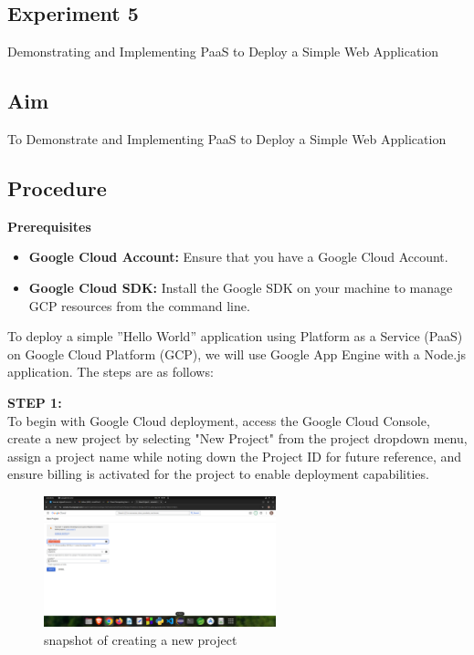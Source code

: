 \documentclass[12pt]{article}
\begin{document}
\begin{spacing}{1.5}
\begin{adjustwidth}{0cm}{0cm}
\begin{justify}
\newpage

\section{Experiment 5}
Demonstrating and Implementing PaaS to Deploy a Simple Web Application

\subsection{Aim}
To Demonstrate and Implementing PaaS to Deploy a Simple Web Application

\subsection{Procedure}

\textbf{Prerequisites}

\begin{itemize}
    \item \textbf{Google Cloud Account:} Ensure that you have a Google Cloud Account.
    \item \textbf{Google Cloud SDK:} Install the Google SDK on your machine to manage GCP resources from the command line.
\end{itemize}

To deploy a simple ”Hello World” application using Platform as a Service (PaaS)
on Google Cloud Platform (GCP), we will use Google App Engine with a Node.js
application. The steps are as follows:

\textbf{STEP 1:} \\
To begin with Google Cloud deployment, access the Google Cloud Console, create a new project by selecting "New Project" from the project dropdown menu, assign a project name while noting down the Project ID for future reference, and ensure billing is activated for the project to enable deployment capabilities.

\begin{figure}[H]
    \centering
    \includegraphics[width=0.6\textwidth]{exp 5/Screenshot from 2024-10-19 10-09-31.png}
    \caption{snapshot of creating a new project}
    \label{fig: 1}
\end{figure}


\end{justify}
\end{adjustwidth}
\end{spacing}
\end{document}
